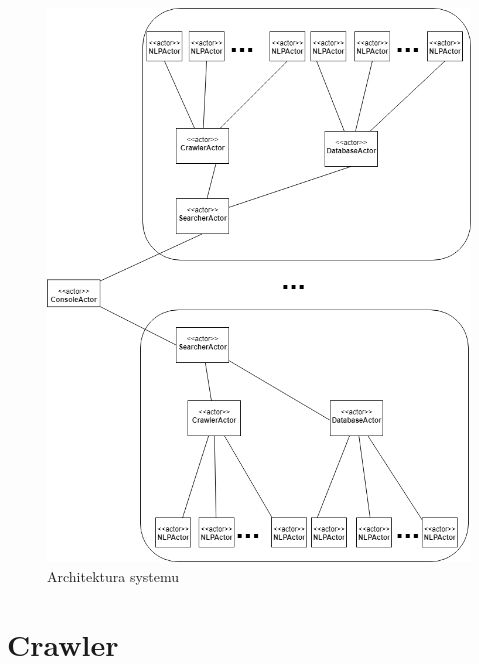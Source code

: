 \documentclass[titlepage]{article}
\begin{document}
\begin{figure}[h!]
\centering
\includegraphics[width=\textwidth]{sag.png}
\caption{Architektura systemu}
\label{fig:architecture}
\end{figure}

\FloatBarrier

\section{Crawler}
\end{document}
